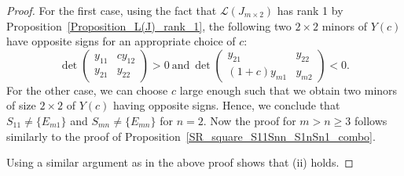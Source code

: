 \documentclass[10pt,a4paper]{amsart}
\begin{document}
\begin{proof}
	For the first case, using the fact that $\mathcal{L}(J_{m\times2})$ has rank 1 by Proposition~\ref{Proposition_L(J)_rank_1}, the following two $2\times2$ minors of $Y(c)$ have opposite signs for an appropriate choice of $c$:
		\[\det\begin{pmatrix}
			y_{11} & cy_{12} \\
			y_{21} & y_{22} 
		\end{pmatrix}>0~\text{and}~
		\det\begin{pmatrix}
			y_{21} & y_{22} \\
			(1+c)y_{m1} & y_{m2} 
		\end{pmatrix}<0.\]
	For the other case, we can choose $c$ large enough such that we obtain two minors of size $2\times2$ of $Y(c)$ having opposite signs. Hence, we conclude that $S_{11}\neq\{E_{m1}\}$ and $S_{mn}\neq\{E_{mn}\}$ for $n=2$. Now the proof for $m>n\geq3$ follows similarly to the proof of Proposition~\ref{SR_square_S11Snn_S1nSn1_combo}.
	
	Using a similar argument as in the above proof shows that (ii) holds.
	\end{proof}
\end{document}
